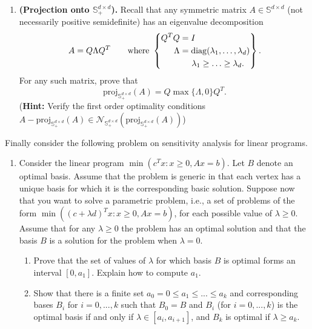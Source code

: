 \documentclass[12pt]{article}
\numberwithin{equation}{section}
\newcommand{\diag}{{\rm diag}}
\newcommand{\cN}{\mathcal{N}}
\newcommand{\proj}{\mathrm{proj}}
\theoremstyle{remark}
\begin{document}
\begin{enumerate}
\item {\bf(Projection onto $\mathbb{S}_+^{d\times d}$).} Recall that any symmetric matrix $A \in \mathbb{S}^{d\times d}$ (not necessarily positive semidefinite) has an eigenvalue decomposition 
$$
A = Q \Lambda Q^T\qquad \text{where } 
\left\{\begin{aligned}
 Q^TQ &= I \\
 \Lambda &= \diag(\lambda_1, \ldots, \lambda_d)\\
 &\hspace{14pt} \lambda_1 \geq \ldots \geq \lambda_d.
 \end{aligned}\right\}.
$$
For any such matrix, prove that 
$$
\proj_{\mathbb{S}_+^{d\times d}}(A) = Q\max \{ \Lambda, 0\} Q^T.
$$
({\bf Hint:} Verify the first order optimality conditions $A - \proj_{\mathbb{S}_+^{d\times d}}(A) \in \cN_{\mathbb{S}_+^{d\times d}}(\proj_{\mathbb{S}_+^{d\times d}}(A))$)
\end{enumerate}
Finally consider the following problem on sensitivity analysis for linear programs. 
\begin{enumerate}[resume]
\item 
\Coffeecup Consider the linear program $\min(c^Tx : x \geq 0, Ax = b)$. Let $B$ denote an optimal basis. Assume that the problem is generic in that each vertex has a unique basis for which it is the corresponding basic solution. Suppose now that you want to solve a parametric problem, i.e., a set of problems of the form $\min((c + \lambda d)^T x : x \geq 0, Ax = b)$, for each possible value of $\lambda \geq 0$. Assume that for any $\lambda \geq 0$ the problem has an optimal solution and that the basis $B$ is a solution for the problem when $\lambda = 0$.\\
\begin{enumerate}
\item Prove that the set of values of $\lambda$ for which basis $B$ is optimal forms an interval $[0, a_1]$. Explain how to compute $a_1$.\\
\item Show that there is a finite set $a_0 = 0 \leq a_1 \leq . . . \leq a_k$ and corresponding bases $B_i$ for $i = 0, . . . , k$ such that $B_0 = B$ and $B_i$ (for $i = 0, . . . , k$) is the optimal basis if and only if $\lambda \in [a_i, a_{i+1}]$, and $B_k$ is optimal if $\lambda \geq a_k$.
\end{enumerate}
\end{enumerate}

			
	
\end{document}
